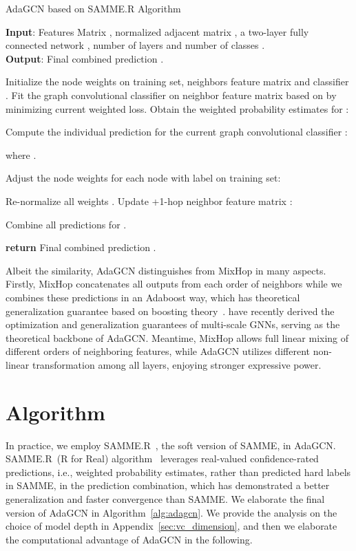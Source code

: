 \documentclass{article} \usepackage{iclr2021_conference,times}
\begin{document}
\begin{algorithm}[t!]
	\caption{AdaGCN based on SAMME.R Algorithm}
	\textbf{Input}: Features Matrix , normalized adjacent matrix , a two-layer fully connected network , number of layers  and number of classes .\\
	
	\textbf{Output}: Final combined prediction .
	
	\begin{algorithmic}[1] \STATE Initialize the node weights  on training set, neighbors feature matrix  and classifier . 
		\STATE Fit the graph convolutional classifier  on neighbor feature matrix  based on  by minimizing current weighted loss.
		\STATE Obtain the weighted probability estimates  for :
		
		
		\STATE Compute the individual prediction  for the current graph convolutional classifier :
		
		where .
		
		\STATE Adjust the node weights  for each node  with label  on training set:
		
		
		\STATE Re-normalize all weights .
		\STATE Update +1-hop neighbor feature matrix :
		
		\ENDFOR
		\STATE Combine all predictions  for .
		
		
		\STATE \textbf{return} Final combined prediction .
	\end{algorithmic}
	\label{alg:adagcn}
\end{algorithm}


Albeit the similarity, AdaGCN distinguishes from MixHop in many aspects. Firstly, MixHop concatenates all outputs from each order of neighbors while we combines these predictions in an Adaboost way, which has theoretical generalization guarantee based on boosting theory~\cite{hastie2009multi}. \cite{oono2020optimization} have recently derived the optimization and generalization guarantees of multi-scale GNNs, serving as the theoretical backbone of AdaGCN. Meantime, MixHop allows full linear mixing of different orders of neighboring features, while AdaGCN utilizes different non-linear transformation  among all layers, enjoying stronger expressive power.

\section{Algorithm}\label{alg:algorithm_AdaGCN}
In practice, we employ SAMME.R~\citep{hastie2009multi}, the soft version of SAMME, in AdaGCN. SAMME.R~(R for Real) algorithm~\citep{hastie2009multi} leverages real-valued confidence-rated predictions, i.e., weighted probability estimates, rather than predicted hard labels in SAMME,  in the prediction combination, which has demonstrated a better generalization and faster convergence than SAMME. We elaborate the final version of AdaGCN in Algorithm~\ref{alg:adagcn}. We provide the analysis on the choice of model depth  in Appendix~\ref{sec:vc_dimension}, and then we elaborate the computational advantage of AdaGCN in the following.
\end{document}
